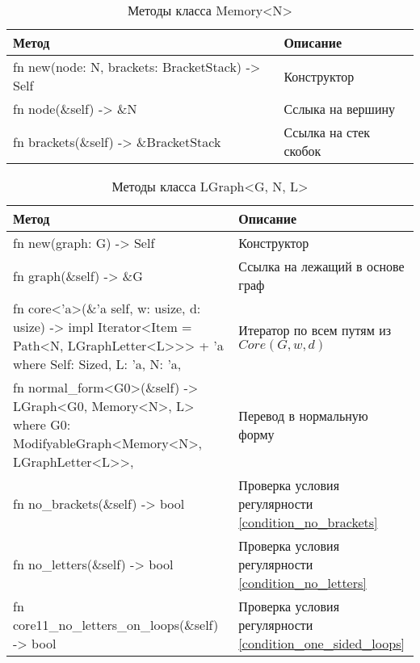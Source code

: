 \begin{table}
    \caption{Методы класса Memory<N>}
    \label{class_MemoryN_api}
    \begin{tabular}{|m{20em}|m{20em}|}
        \hline
        \textbf{Метод} & \textbf{Описание}\\
        \hline
            fn new(node: N, brackets: BracketStack) -> Self & Конструктор \\
        \hline
            fn node(\&self) -> \&N & Сслыка на вершину \\
        \hline
            fn brackets(\&self) -> \&BracketStack & Ссылка на стек скобок \\
        \hline
    \end{tabular}
\end{table}

\begin{table}
    \caption{Методы класса LGraph<G, N, L>}
    \label{class_LGraphGNL_api}
    \begin{tabular}{|m{20em}|m{20em}|}
        \hline
        \textbf{Метод} & \textbf{Описание}\\
        \hline
            fn new(graph: G) -> Self & Конструктор \\
        \hline
            fn graph(\&self) -> \&G & Ссылка на лежащий в основе граф \\
        \hline
            fn core<'a>(\&'a self, w: usize, d: usize) -> impl Iterator<Item = Path<N, LGraphLetter<L>{}>{}> + 'a \newline
            where Self: Sized, L: 'a, N: 'a, & Итератор по всем путям из $Core(G, w, d)$ \\
        \hline
            fn normal\_form<G0>(\&self) -> LGraph<G0, Memory<N>, L> \newline 
            where G0: ModifyableGraph<Memory<N>, LGraphLetter<L>{}>, & Перевод в нормальную форму \\
        \hline
            fn no\_brackets(\&self) -> bool & Проверка условия регулярности \ref{condition_no_brackets} \\
        \hline
            fn no\_letters(\&self) -> bool & Проверка условия регулярности \ref{condition_no_letters} \\
        \hline
            fn core11\_no\_letters\_on\_loops(\&self) -> bool & Проверка условия регулярности \ref{condition_one_sided_loops} \\
        \hline
    \end{tabular}
\end{table}
